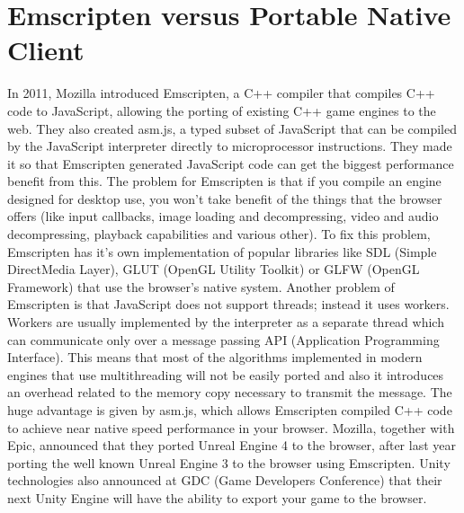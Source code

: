 \section{Emscripten versus Portable Native Client}
\label{sec: Emscripten, PNaCl}

In 2011, Mozilla introduced Emscripten, a C++ compiler that compiles C++ code to JavaScript, allowing the porting of existing C++ game engines to the web. They also created asm.js, a typed subset of JavaScript that can be compiled by the JavaScript interpreter directly to microprocessor instructions. They made it so that Emscripten generated JavaScript code can get the biggest performance benefit from this. The problem for Emscripten is that if you compile an engine designed for desktop use, you won't take benefit of the things that the browser offers (like input callbacks, image loading and decompressing, video and audio decompressing, playback capabilities and various other). To fix this problem, Emscripten has it's own implementation of popular libraries like SDL (Simple DirectMedia Layer), GLUT (OpenGL Utility Toolkit) or GLFW (OpenGL Framework) that use the browser's native system. Another problem of Emscripten is that JavaScript does not support threads; instead it uses workers. Workers are usually implemented by the interpreter as a separate thread which can communicate only over a message passing API (Application Programming Interface). This means that most of the algorithms implemented in modern engines that use multithreading will not be easily ported and also it introduces an overhead related to the memory copy necessary to transmit the message. The huge advantage is given by asm.js, which allows Emscripten compiled C++ code to achieve near native speed performance in your browser. Mozilla, together with Epic, announced that they ported Unreal Engine 4 to the browser, after last year porting the well known Unreal Engine 3 to the browser using Emscripten. Unity technologies also announced at GDC (Game Developers Conference) that their next Unity Engine will have the ability to export your game to the browser.


